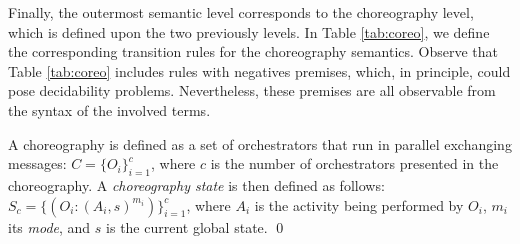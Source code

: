 \begin{table}[!ht]
\centering
{\scriptsize
{}}
\caption{\label{tab:noti}Action and delay transition rules for orchestrators.}
\end{table}


Finally, the outermost semantic level corresponds to the choreography level, which is defined upon the two previously levels. In Table \ref{tab:coreo}, we define the corresponding transition rules for the choreography semantics. Observe that Table \ref{tab:coreo} includes rules with negatives premises, which, in principle, could pose decidability problems. Nevertheless, these premises are all observable from the syntax of the involved terms.

\begin{definition}
A choreography is defined as a set of orchestrators that run in parallel exchanging messages: $C=\{O_i\}_{i=1}^c$, where $c$ is the number of orchestrators
presented in the choreography. A {\it choreography state} is then defined as follows:
$S_c=\{(O_i:(A_i, s)^{m_i})\}_{i=1}^c$, where $A_i$ is the activity being performed by $O_i$, $m_{i}$ its \emph{mode}, and $s$ is the current global state.
\qed
\vspace{0.1cm}
\end{definition}

